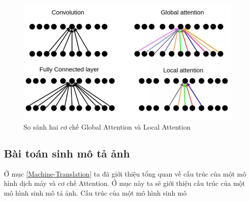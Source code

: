 \documentclass[14pt, a4paper]{article}
\numberwithin{equation}{section}
\numberwithin{algorithm}{section}
\numberwithin{figure}{section}
\numberwithin{dl}{section}
\numberwithin{md}{section}
\numberwithin{bd}{section}
\numberwithin{dn}{section}
\numberwithin{hq}{section}
\begin{document}
    \begin{figure}[h!] \centering

        \includegraphics[scale=0.4]{Local_Global_Attention.jpg}
        \caption{So sánh hai cơ chế Global Attention và Local Attention}
    
        \label{fig:Local_Global_Attention}
    \end{figure}

    \subsection{Bài toán sinh mô tả ảnh}

    Ở mục \ref{Machine-Translation} ta đã giới thiệu tổng quan về cấu trúc của một mô hình dịch máy và cơ chế Attention. 
    Ở mục này ta sẽ giới thiệu cấu trúc của một mô hình sinh mô tả ảnh. Cấu trúc của một mô hình sinh mô 

    \newpage
    \printbibliography[title={TÀI LIỆU THAM KHẢO}]

\end{document}
